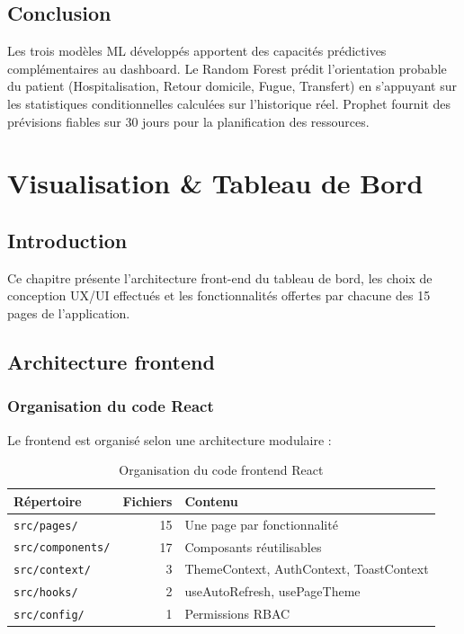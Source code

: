 \documentclass[12pt,a4paper]{report}
\begin{document}
	\section{Conclusion}
	
	Les trois modèles ML développés apportent des capacités prédictives complémentaires au
	dashboard. Le Random Forest prédit l'orientation probable du patient (Hospitalisation,
	Retour domicile, Fugue, Transfert) en s'appuyant sur les statistiques conditionnelles
	calculées sur l'historique réel. Prophet fournit des prévisions fiables sur 30 jours
	pour la planification des ressources.
	
	\chapter{Visualisation \& Tableau de Bord}
	
	\section{Introduction}
	
	Ce chapitre présente l'architecture front-end du tableau de bord, les choix de conception
	UX/UI effectués et les fonctionnalités offertes par chacune des 15 pages de l'application.
	
	\section{Architecture frontend}
	
	\subsection{Organisation du code React}
	
	Le frontend est organisé selon une architecture modulaire :
	
	\begin{table}[H]
		\centering
		\caption{Organisation du code frontend React}
		\renewcommand{\arraystretch}{1.2}
		\begin{tabular}{lrl}
			\toprule
			\textbf{Répertoire} & \textbf{Fichiers} & \textbf{Contenu} \\
			\midrule
			\texttt{src/pages/}      & 15 & Une page par fonctionnalité \\
			\texttt{src/components/} & 17 & Composants réutilisables \\
			\texttt{src/context/}    &  3 & ThemeContext, AuthContext, ToastContext \\
			\texttt{src/hooks/}      &  2 & useAutoRefresh, usePageTheme \\
			\texttt{src/config/}     &  1 & Permissions RBAC \\
			\bottomrule
		\end{tabular}
	\end{table}
	
\end{document}
